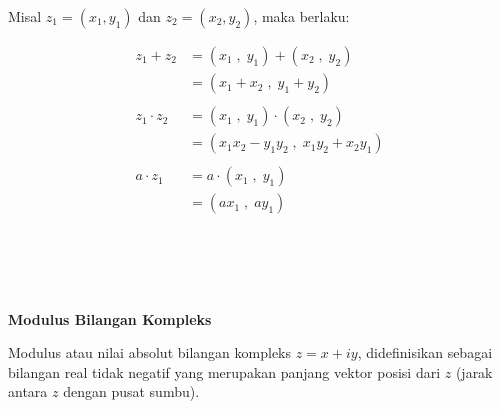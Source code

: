 \documentclass{article}
\begin{document}
    Misal $ z_1 = ( x_1 , y_1 )  $ dan $ z_2 = ( x_2 , y_2 ) $, maka berlaku:

    \begin{align}
            z_1 + z_2   & = ( x_1 \;,\; y_1 ) + ( x_2 \;,\; y_2 )
            \nonumber\\
            & = ( x_1 + x_2 \;,\; y_1 + y_2 )
            \\\nonumber\\
            z_1 \cdot z_2   & = ( x_1 \;,\; y_1 ) \cdot ( x_2 \;,\; y_2 )
                            \nonumber\\
                            & = ( x_1 x_2 - y_1 y_2 \;,\; x_1 y_2 + x_2 y_1 )
                            \\\nonumber\\
            a \cdot z_1 & = a \cdot ( x_1 \;,\; y_1 )
                        \nonumber\\
                        & = ( ax_1 \;,\; ay_1 )
    \end{align}
    \\ \\ \\ \\

    \begin{center}
        \textbf{Modulus Bilangan Kompleks}
    \end{center}

    Modulus atau nilai absolut bilangan kompleks $ z = x + iy $, didefinisikan sebagai bilangan real tidak negatif yang merupakan panjang vektor posisi dari $z$ (jarak antara $z$ dengan pusat sumbu).
    \\ \\

    \\ \\
\end{document}
